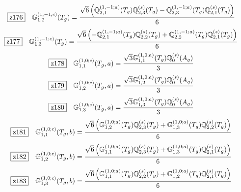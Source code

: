 \documentclass[fleqn,10pt,landscape]{jsarticle}
\begin{document}
\begin{dmath*}
\hspace*{3mm}\fbox{z176}\quad \mathbb{G}_{1,2}^{(1,-1;c)}(T_{g})=\frac{\sqrt{6} \left(\mathbb{Q}_{2,1}^{(1,-1;a)}(T_{g}) \mathbb{Q}_{2,3}^{(s)}(T_{g}) - \mathbb{Q}_{2,3}^{(1,-1;a)}(T_{g}) \mathbb{Q}_{2,1}^{(s)}(T_{g})\right)}{6}
\end{dmath*}
\begin{dmath*}
\hspace*{3mm}\fbox{z177}\quad \mathbb{G}_{1,3}^{(1,-1;c)}(T_{g})=\frac{\sqrt{6} \left(- \mathbb{Q}_{2,1}^{(1,-1;a)}(T_{g}) \mathbb{Q}_{2,2}^{(s)}(T_{g}) + \mathbb{Q}_{2,2}^{(1,-1;a)}(T_{g}) \mathbb{Q}_{2,1}^{(s)}(T_{g})\right)}{6}
\end{dmath*}
\begin{dmath*}
\hspace*{3mm}\fbox{z178}\quad \mathbb{G}_{1,1}^{(1,0;c)}(T_{g},a)=\frac{\sqrt{3} \mathbb{G}_{1,1}^{(1,0;a)}(T_{g}) \mathbb{Q}_{0}^{(s)}(A_{g})}{3}
\end{dmath*}
\begin{dmath*}
\hspace*{3mm}\fbox{z179}\quad \mathbb{G}_{1,2}^{(1,0;c)}(T_{g},a)=\frac{\sqrt{3} \mathbb{G}_{1,2}^{(1,0;a)}(T_{g}) \mathbb{Q}_{0}^{(s)}(A_{g})}{3}
\end{dmath*}
\begin{dmath*}
\hspace*{3mm}\fbox{z180}\quad \mathbb{G}_{1,3}^{(1,0;c)}(T_{g},a)=\frac{\sqrt{3} \mathbb{G}_{1,3}^{(1,0;a)}(T_{g}) \mathbb{Q}_{0}^{(s)}(A_{g})}{3}
\end{dmath*}
\begin{dmath*}
\hspace*{3mm}\fbox{z181}\quad \mathbb{G}_{1,1}^{(1,0;c)}(T_{g},b)=\frac{\sqrt{6} \left(\mathbb{G}_{1,2}^{(1,0;a)}(T_{g}) \mathbb{Q}_{2,3}^{(s)}(T_{g}) + \mathbb{G}_{1,3}^{(1,0;a)}(T_{g}) \mathbb{Q}_{2,2}^{(s)}(T_{g})\right)}{6}
\end{dmath*}
\begin{dmath*}
\hspace*{3mm}\fbox{z182}\quad \mathbb{G}_{1,2}^{(1,0;c)}(T_{g},b)=\frac{\sqrt{6} \left(\mathbb{G}_{1,1}^{(1,0;a)}(T_{g}) \mathbb{Q}_{2,3}^{(s)}(T_{g}) + \mathbb{G}_{1,3}^{(1,0;a)}(T_{g}) \mathbb{Q}_{2,1}^{(s)}(T_{g})\right)}{6}
\end{dmath*}
\begin{dmath*}
\hspace*{3mm}\fbox{z183}\quad \mathbb{G}_{1,3}^{(1,0;c)}(T_{g},b)=\frac{\sqrt{6} \left(\mathbb{G}_{1,1}^{(1,0;a)}(T_{g}) \mathbb{Q}_{2,2}^{(s)}(T_{g}) + \mathbb{G}_{1,2}^{(1,0;a)}(T_{g}) \mathbb{Q}_{2,1}^{(s)}(T_{g})\right)}{6}
\end{dmath*}
\end{document}
